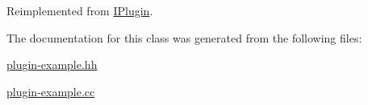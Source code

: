 Reimplemented from \hyperlink{classIPlugin_adcfd0fb076b3d72246d1dbdccecc69d6}{I\-Plugin}.



The documentation for this class was generated from the following files\-:\begin{DoxyCompactItemize}
\item 
\hyperlink{plugin-example_8hh}{plugin-\/example.\-hh}\item 
\hyperlink{plugin-example_8cc}{plugin-\/example.\-cc}\end{DoxyCompactItemize}

